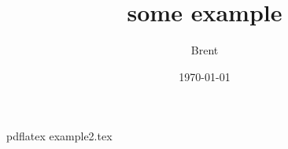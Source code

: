 \documentclass{article}
\title{some example}
\author{Brent}
\date{\today}
\begin{document}
\maketitle

pdflatex example2.tex
\end{document}
